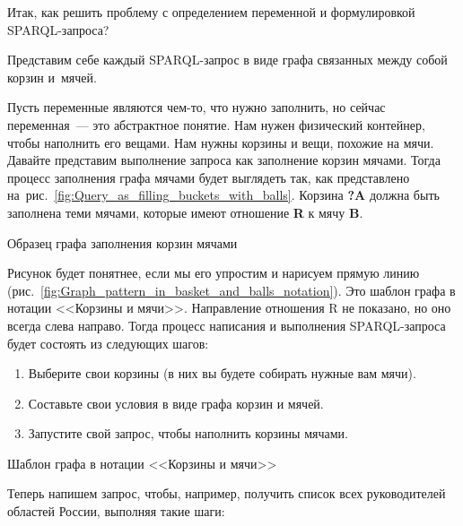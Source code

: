 Итак, как решить проблему с определением переменной и формулировкой SPARQL-запроса?

Представим себе каждый SPARQL-запрос в виде графа связанных между собой корзин и~мячей.

Пусть переменные являются чем-то, что нужно заполнить, но сейчас переменная~--- это абстрактное понятие. 
Нам нужен физический контейнер, чтобы наполнить его вещами. Нам нужны корзины  
и вещи, похожие на мячи. Давайте представим выполнение запроса как заполнение корзин мячами.
Тогда процесс заполнения графа мячами будет выглядеть так, как представлено 
на~рис.~\ref{fig:Query_as_filling_buckets_with_balls}. 
Корзина \textbf{?A} должна быть заполнена теми мячами, которые имеют отношение \textbf{R} к мячу \textbf{B}.

\newpage
\begin{marginfigure}[0cm]
	{
		\setlength{\fboxsep}{0pt}%
		\setlength{\fboxrule}{1pt}%
	}
    \caption{Образец графа заполнения корзин мячами}
	\label{fig:Query_as_filling_buckets_with_balls}
\end{marginfigure}

Рисунок будет понятнее, если мы его упростим и нарисуем прямую линию (рис.~\ref{fig:Graph_pattern_in_basket_and_balls_notation}). Это шаблон графа в нотации <<Корзины и мячи>>. Направление отношения R не показано, но оно всегда слева направо.
Тогда процесс написания и выполнения SPARQL-запроса будет состоять из следующих шагов:
\begin{enumerate}
    \item Выберите свои корзины (в них вы будете собирать нужные вам мячи).
    \item Составьте свои условия в виде графа корзин и мячей.
    \item Запустите свой запрос, чтобы наполнить корзины мячами.
\end{enumerate}


\begin{marginfigure}[2\baselineskip]
	{
		\setlength{\fboxsep}{0pt}%
		\setlength{\fboxrule}{1pt}%
	}
    \caption{Шаблон графа в нотации <<Корзины и мячи>>}
	\label{fig:Graph_pattern_in_basket_and_balls_notation}
\end{marginfigure}

Теперь напишем запрос, чтобы, например, получить список всех руководителей областей России, выполняя такие шаги:


